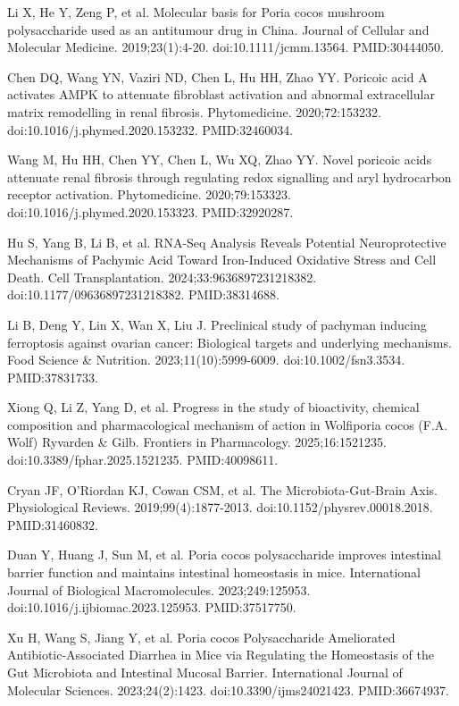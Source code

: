 \documentclass[12pt,oneside]{book}
\newcommand{\reff}[2]{\par\hangindent=7mm\hangafter=1\noindent[#1]\hspace{2mm}#2\par}
\begin{document}
\reff{9}{Li X, He Y, Zeng P, et al. Molecular basis for Poria cocos mushroom polysaccharide used as an antitumour drug in China. Journal of Cellular and Molecular Medicine. 2019;23(1):4-20. doi:10.1111/jcmm.13564. PMID:30444050.}

\reff{10}{Chen DQ, Wang YN, Vaziri ND, Chen L, Hu HH, Zhao YY. Poricoic acid A activates AMPK to attenuate fibroblast activation and abnormal extracellular matrix remodelling in renal fibrosis. Phytomedicine. 2020;72:153232. doi:10.1016/j.phymed.2020.153232. PMID:32460034.}

\reff{11}{Wang M, Hu HH, Chen YY, Chen L, Wu XQ, Zhao YY. Novel poricoic acids attenuate renal fibrosis through regulating redox signalling and aryl hydrocarbon receptor activation. Phytomedicine. 2020;79:153323. doi:10.1016/j.phymed.2020.153323. PMID:32920287.}

\reff{12}{Hu S, Yang B, Li B, et al. RNA-Seq Analysis Reveals Potential Neuroprotective Mechanisms of Pachymic Acid Toward Iron-Induced Oxidative Stress and Cell Death. Cell Transplantation. 2024;33:9636897231218382. doi:10.1177/09636897231218382. PMID:38314688.}

\reff{13}{Li B, Deng Y, Lin X, Wan X, Liu J. Preclinical study of pachyman inducing ferroptosis against ovarian cancer: Biological targets and underlying mechanisms. Food Science \& Nutrition. 2023;11(10):5999-6009. doi:10.1002/fsn3.3534. PMID:37831733.}

\reff{14}{Xiong Q, Li Z, Yang D, et al. Progress in the study of bioactivity, chemical composition and pharmacological mechanism of action in Wolfiporia cocos (F.A. Wolf) Ryvarden \& Gilb. Frontiers in Pharmacology. 2025;16:1521235. doi:10.3389/fphar.2025.1521235. PMID:40098611.}

\reff{15}{Cryan JF, O'Riordan KJ, Cowan CSM, et al. The Microbiota-Gut-Brain Axis. Physiological Reviews. 2019;99(4):1877-2013. doi:10.1152/physrev.00018.2018. PMID:31460832.}

\reff{16}{Duan Y, Huang J, Sun M, et al. Poria cocos polysaccharide improves intestinal barrier function and maintains intestinal homeostasis in mice. International Journal of Biological Macromolecules. 2023;249:125953. doi:10.1016/j.ijbiomac.2023.125953. PMID:37517750.}

\reff{17}{Xu H, Wang S, Jiang Y, et al. Poria cocos Polysaccharide Ameliorated Antibiotic-Associated Diarrhea in Mice via Regulating the Homeostasis of the Gut Microbiota and Intestinal Mucosal Barrier. International Journal of Molecular Sciences. 2023;24(2):1423. doi:10.3390/ijms24021423. PMID:36674937.}
\end{document}
